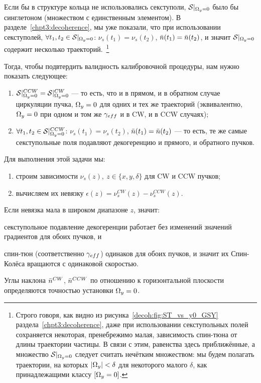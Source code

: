 Если бы в структуре кольца не использовались секступоли, $\Stab*$ было бы синглетоном (множеством с
единственным элементом). В разделе~\ref{chpt3:decoherence}, мы уже показали, что
при использовании секступолей, ${\forall t_1,t_2\in\Stab*}$:
${\nu_s(t_1) = \nu_s(t_2)}$, ${\bar n(t_1) = \bar n(t_2)}$, и значит $\Stab*$ содержит
несколько траекторий.~\footnote{Строго говоря, как видно из рисунка~\ref{decoh:fig:ST_vs_y0_GSY}
	раздела~\ref{chpt3:decoherence}, даже при использовании секступольных полей сохраняется некоторая,
	пренебрежимо малая, зависимость спин-тюна от длины траектории частицы. В связи с этим, равенства
	здесь приближённые, а множество $\Stab*$ следует считать нечётким множеством: мы будем полагать траектории,
	на которых ${|\Omega_y| < \delta}$ для некоторого малого $\delta$, как принадлежащими классу $[\Omega_y=0]$.}

Тогда, чтобы подвтердить валидность калибровочной процедуры, нам нужно показать следующее:
\begin{enumerate}
	\item ${\Stab*^{CCW} = \Stab*^{CW}}$ --- то есть, что и в прямом, и в обратном случае циркуляции пучка,
	${\Omega_y = 0}$ для одних и тех же траекторий (эквивалентно, ${\Omega_y=0}$ при одном и том же $\g*$ и в CW, и в CCW
	случаях);
	\item ${\forall t_1,t_2\in\Stab*^{CCW}}$: ${\nu_s(t_1) = \nu_s(t_2)}$, ${\bar n(t_1) = \bar n(t_2)}$ ---
	то есть, те же самые секступольные поля подавляют декогеренцию и прямого, и обратного пучков.
\end{enumerate}

Для выполнения этой задачи мы:
\begin{enumerate}
	\item строим зависимости ${\nu_s(z),~z\in\{x,y,\delta\}}$ для CW и CCW пучков;
	\item вычисляем их невязку ${\epsilon(z) = \nu_s^{CW}(z) - \nu_s^{CCW}(z)}$.
\end{enumerate}

Если невязка мала в широком диапазоне $z$, значит:
\begin{enumerate*}[1)]
	\item секступольное подавление декогеренции работает без изменений значений градиентов для обоих пучков, и
	\item спин-тюн (соответственно $\g*$) одинаков для обоих пучков, и значит их Спин-Колёса
	вращаются с одинаковой скоростью.
\end{enumerate*}

Углы наклона $\bar n^{CW}$, $\bar n^{CCW}$ по отношению к горизонтальной плоскости определяются точностью установки ${\Omega_y=0}$.

